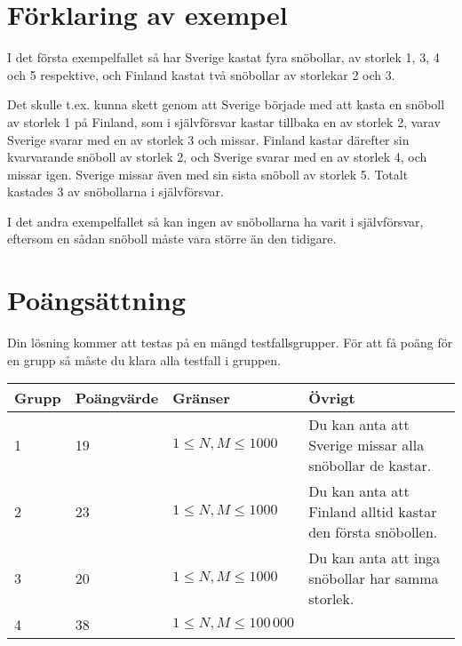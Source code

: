 \section*{Förklaring av exempel}

I det första exempelfallet så har Sverige kastat fyra snöbollar, av storlek 1, 3, 4 och 5 respektive, och Finland kastat två snöbollar av storlekar 2 och 3.

Det skulle t.ex. kunna skett genom att Sverige började med att kasta en snöboll av storlek 1 på Finland, som i självförsvar kastar tillbaka en av storlek 2, varav Sverige svarar med en av storlek 3 och missar.
Finland kastar därefter sin kvarvarande snöboll av storlek 2, och Sverige svarar med en av storlek 4, och missar igen. Sverige missar även med sin sista snöboll av storlek 5. Totalt kastades 3 av snöbollarna i självförsvar.

I det andra exempelfallet så kan ingen av snöbollarna ha varit i självförsvar, eftersom en sådan snöboll måste vara större än den tidigare.

\section*{Poängsättning}

Din lösning kommer att testas på en mängd testfallsgrupper. För att få poäng för en grupp
så måste du klara alla testfall i gruppen.

\begin{tabular}{| l | l | l | l |}
\hline
Grupp & Poängvärde & Gränser & Övrigt \\ \hline
1     & 19         &  $1 \le N,M \le 1000$ & Du kan anta att Sverige missar alla snöbollar de kastar. \\ \hline
2     & 23         &  $1 \le N,M \le 1000$ & Du kan anta att Finland alltid kastar den första snöbollen. \\ \hline
3     & 20         &  $1 \le N,M \le 1000$ & Du kan anta att inga snöbollar har samma storlek. \\ \hline
4     & 38         &  $1 \le N,M \le 100\,000$ & \\ \hline
\end{tabular}
